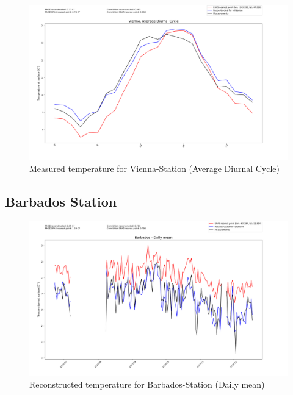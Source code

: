 \begin{figure}
    \centering
    \includegraphics[width=\textwidth]{resources/images/charts/vienna_eval_grib_final/Vienna, Average Diurnal Cycle.png}
    \caption{Measured temperature for Vienna-Station (Average Diurnal Cycle)}
\end{figure}

\newpage

\subsection*{Barbados Station}

\begin{figure}
    \centering
    \includegraphics[width=\textwidth]{resources/images/charts/barbados_eval_grib_final/Barbados - Daily mean.png}
    \caption{Reconstructed temperature for Barbados-Station (Daily mean)}
\end{figure}

